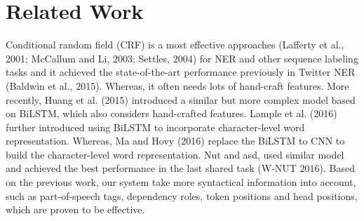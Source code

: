 \section{Related Work}
\label{sec:related}
Conditional random field (CRF) is a most effective approaches (Lafferty et al., 2001; McCallum
and Li, 2003; Settles, 2004) for NER and other sequence labeling tasks and it achieved the state-of-the-art performance previously in Twitter NER (Baldwin et al., 2015). 
Whereas, it often needs lots of hand-craft features.
More recently, Huang et al. (2015) introduced a similar but more complex model based on BiLSTM, which also considers hand-crafted features. 
Lample et al. (2016) further introduced using BiLSTM to incorporate character-level word representation. Whereas, Ma and Hovy (2016) replace the BiLSTM to CNN to build the character-level word representation. Nut and asd, used similar model and achieved the best performance in the last shared task (W-NUT 2016). 
Based on the previous work, our system take more syntactical information into account, such as part-of-speech tags, dependency roles, token positions and head positions, which are proven to be effective.
 



